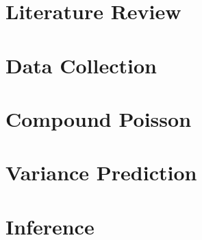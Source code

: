 \documentclass[12pt, a4paper]{memoir}
\begin{document}
\chapter{Literature Review}


\chapter{Data Collection}

\chapter{Compound Poisson}


\chapter{Variance Prediction}


\chapter{Inference}





\end{document}

